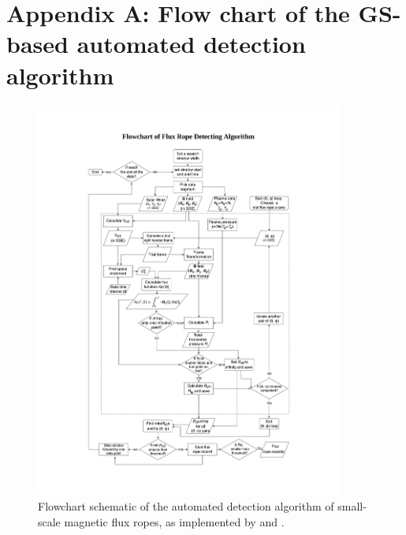 


\chapter{Appendix A: Flow chart of the GS-based automated detection algorithm}\label{appendix:gs-flowchart}

\renewcommand{\thechapter}{A}
\setcounter{figure}{0} 

\begin{figure}
    \centering
    \includegraphics[width=0.9\textwidth]{Figures/Flowchart of Flux Rope Detecting Algorithm.pdf}
    \caption[Flowchart of GS-reconstruction based automated detection algorithm]{Flowchart schematic of the automated detection algorithm of small-scale magnetic flux ropes, as implemented by \cite{Hu:2018} and \cite{Zheng:2018}.}
    \label{fig:flowchart}
\end{figure}